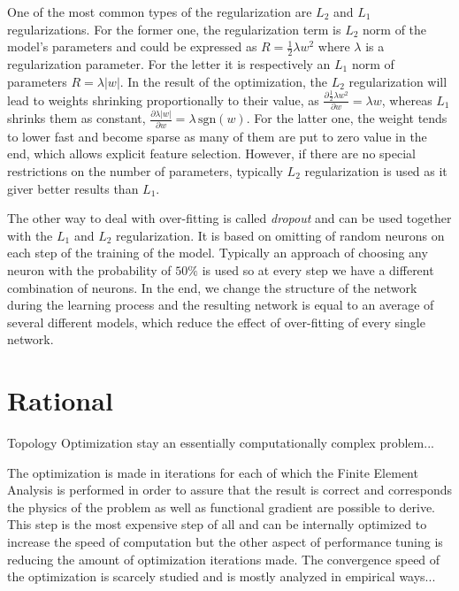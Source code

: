 One of the most common types of the regularization are $L_{2}$ and $L_{1}$ regularizations.
For the former one, the regularization term is $L_{2}$ norm of the model's parameters and could be expressed as $R=\frac{1}{2}\lambda w^{2}$ where $\lambda$ is a regularization parameter.
For the letter it is respectively an $L_{1}$ norm of parameters $R=\lambda |w|$.
In the result of the optimization, the $L_{2}$ regularization will lead to weights shrinking proportionally to their value, as $\frac{\partial \frac{1}{2} \lambda w^{2} }{\partial w} = \lambda w$, whereas $L_{1}$ shrinks them as constant, $\frac{\partial \lambda |w| }{\partial w} = \lambda \, \mathrm{sgn}(w) $.
For the latter one, the weight tends to lower fast and become sparse as many of them are put to zero value in the end, which allows explicit feature selection.
However, if there are no special restrictions on the number of parameters, typically $L_{2}$ regularization is used as it giver better results than $L_{1}$.

The other way to deal with over-fitting is called \textit{dropout} and can be used together with the $L_{1}$ and $L_{2}$ regularization.
It is based on omitting of random neurons on each step of the training of the model.
Typically an approach of choosing any neuron with the probability of $50\%$ is used so at every step we have a different combination of neurons.
In the end, we change the structure of the network during the learning process and the resulting network is equal to an average of several different models, which reduce the effect of over-fitting of every single network.

 

\section{Rational}

Topology Optimization stay an essentially computationally complex problem...
\bigskip

The optimization is made in iterations for each of which the Finite Element Analysis is performed in order to assure that the result is correct and corresponds the physics of the problem as well as functional gradient are possible to derive.
This step is the most expensive step of all and can be internally optimized to increase the speed of computation but the other aspect of performance tuning is reducing the amount of optimization iterations made.
The convergence speed of the optimization is scarcely studied and is mostly analyzed in empirical ways...
\bigskip

